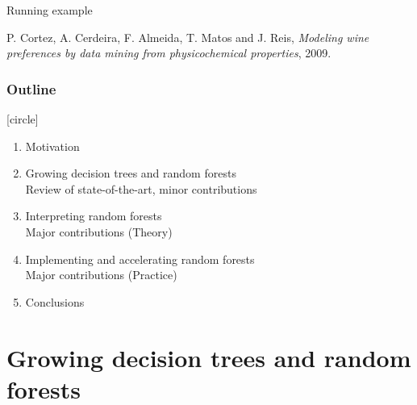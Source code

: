 \documentclass{beamer}
\begin{document}
\begin{frame}{Running example}
\vspace{1cm}

{\footnotesize
P. Cortez, A. Cerdeira, F. Almeida, T. Matos and J. Reis,
{\it Modeling wine preferences by data mining from physicochemical properties},
2009.}

\end{frame}



\begin{frame}
  \frametitle{Outline}
  [circle]
  \begin{enumerate}
  \item Motivation

  \vspace{0.5cm}

  \item Growing decision trees and random forests\\
    {\scriptsize Review of state-of-the-art, minor contributions}

\vspace{0.5cm}

  \item Interpreting random forests\\
    {\scriptsize Major contributions (Theory)}\\


\vspace{0.5cm}

  \item Implementing and accelerating random forests\\
    {\scriptsize Major contributions (Practice)}


\vspace{0.5cm}

  \item Conclusions
  \end{enumerate}
\end{frame}


\section{Growing decision trees and random forests}

\end{document}
